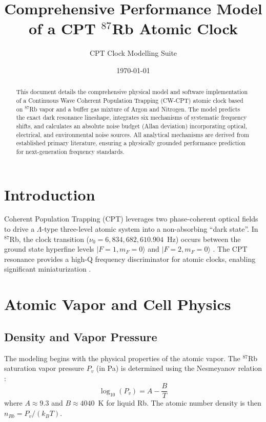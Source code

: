 \documentclass[11pt,a4paper]{article}
\title{\textbf{Comprehensive Performance Model of a CPT $^{87}$Rb Atomic Clock}}
\author{CPT Clock Modelling Suite}
\date{\today}
\begin{document}
\maketitle

\begin{abstract}
This document details the comprehensive physical model and software implementation of a Continuous Wave Coherent Population Trapping (CW-CPT) atomic clock based on $^{87}$Rb vapor and a buffer gas mixture of Argon and Nitrogen. The model predicts the exact dark resonance lineshape, integrates six mechanisms of systematic frequency shifts, and calculates an absolute noise budget (Allan deviation) incorporating optical, electrical, and environmental noise sources. All analytical mechanisms are derived from established primary literature, ensuring a physically grounded performance prediction for next-generation frequency standards.
\end{abstract}

\tableofcontents
\vspace{1em}

\section{Introduction}
Coherent Population Trapping (CPT) leverages two phase-coherent optical fields to drive a $\Lambda$-type three-level atomic system into a non-absorbing ``dark state''. In $^{87}$Rb, the clock transition ($\nu_0 = 6,834,682,610.904$~Hz) occurs between the ground state hyperfine levels $|F=1, m_F=0\rangle$ and $|F=2, m_F=0\rangle$ \cite{Steck2021}. The CPT resonance provides a high-Q frequency discriminator for atomic clocks, enabling significant miniaturization \cite{Zhu1993, Knappe2004}.

\section{Atomic Vapor and Cell Physics}
\subsection{Density and Vapor Pressure}
The modeling begins with the physical properties of the atomic vapor. The $^{87}$Rb saturation vapor pressure $P_v$ (in Pa) is determined using the Nesmeyanov relation \cite{Steck2021, Alcock1984}:
\begin{equation}
\log_{10}(P_v) = A - \frac{B}{T}
\end{equation}
where $A \approx 9.3$ and $B \approx 4040$~K for liquid Rb. The atomic number density is then $n_{Rb} = P_v / (k_B T)$.
\end{document}

